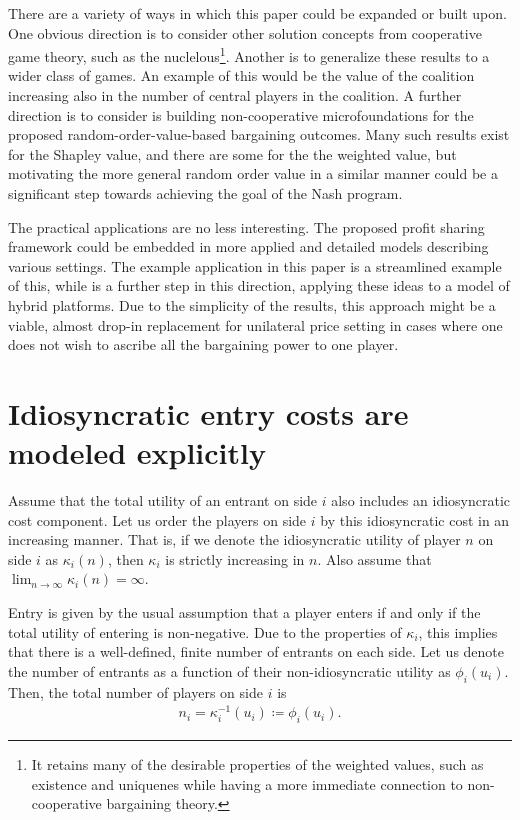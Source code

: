 \documentclass[a4paper]{article}
\begin{document}
There are a variety of ways in which this paper could be expanded or built upon.
One obvious direction is to consider other solution concepts from cooperative game theory, such as the nuclelous\footnote{
    It retains many of the desirable properties of the weighted values, such as existence and uniquenes while having a more immediate connection to non-cooperative bargaining theory.
}.
Another is to generalize these results to a wider class of games.
An example of this would be the value of the coalition increasing also in the number of central players in the coalition.
A further direction is to consider is building non-cooperative microfoundations for the proposed random-order-value-based bargaining outcomes.
Many such results exist for the Shapley value, and there are some for the the weighted value, but motivating the more general random order value in a similar manner could be a significant step towards achieving the goal of the Nash program.

The practical applications are no less interesting.
The proposed profit sharing framework could be embedded in more applied and detailed models describing various settings.
The example application in this paper is a streamlined example of this, while \textcite{stancsics2023hybrid} is a further step in this direction, applying these ideas to a model of hybrid platforms.
Due to the simplicity of the results, this approach might be a viable, almost drop-in replacement for unilateral price setting in cases where one does not wish to ascribe all the bargaining power to one player.


\appendix

\printbibliography

\section{Idiosyncratic entry costs are modeled explicitly}
\label{sec:explicit_entry_costs}

Assume that the total utility of an entrant on side $i$ also includes an idiosyncratic cost component.
Let us order the players on side $i$ by this idiosyncratic cost in an increasing manner.
That is, if we denote the idiosyncratic utility of player $n$ on side $i$ as $\kappa_i(n)$, then $\kappa_i$ is strictly increasing in $n$.
Also assume that $\lim_{n \to \infty} \kappa_i(n) = \infty$.

Entry is given by the usual assumption that a player enters if and only if the total utility of entering is non-negative.
Due to the properties of $\kappa_i$, this implies that there is a well-defined, finite number of entrants on each side.
Let us denote the number of entrants as a function of their non-idiosyncratic utility as $\phi_i(u_i)$.
Then, the total number of players on side $i$ is 
\begin{align*}
    n_i = \kappa_i^{-1}(u_i) \coloneqq \phi_i(u_i).
\end{align*}
\end{document}
